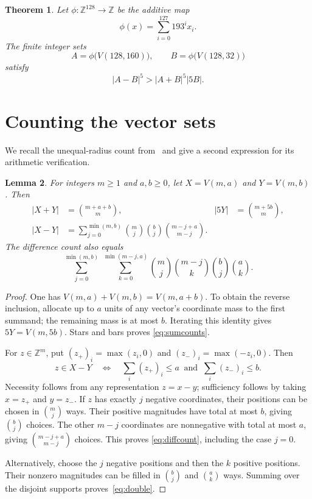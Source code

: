 \documentclass[11pt,a4paper]{article}
\newtheorem{theorem}{Theorem}
\newtheorem{lemma}[theorem]{Lemma}
\newcommand{\Z}{\mathbb Z}
\newcommand{\V}{V}
\begin{document}
\begin{samepage}
\begin{theorem}\label{thm:main}
Let $\phi:\Z^{128}\to\Z$ be the additive map
\[
 \phi(x)=\sum_{i=0}^{127}193^i x_i.
\]
The finite integer sets
\[
 A=\phi\bigl(\V(128,160)\bigr),\qquad
 B=\phi\bigl(\V(128,32)\bigr)
\]
satisfy
\begin{equation}\label{eq:failure}
 |A-B|^5>|A+B|^5|5B|.
\end{equation}
\end{theorem}
\end{samepage}

\section{Counting the vector sets}
We recall the unequal-radius count from~\cite[Lemma~B.1]{glasscock}
and give a second expression for its arithmetic verification.

\begin{lemma}\label{lem:counts}
For integers $m\ge1$ and $a,b\ge0$, let $X=\V(m,a)$ and $Y=\V(m,b)$. Then
\begin{align}
 |X+Y|&=\binom{m+a+b}{m}, &
 |5Y|&=\binom{m+5b}{m},\label{eq:sumcounts}\\
 |X-Y|&=\sum_{j=0}^{\min(m,b)}
       \binom mj\binom bj\binom{m-j+a}{m-j}.\label{eq:diffcount}
\end{align}
The difference count also equals
\begin{equation}\label{eq:double}
 \sum_{j=0}^{\min(m,b)}\ \sum_{k=0}^{\min(m-j,a)}
 \binom mj\binom{m-j}{k}\binom bj\binom ak.
\end{equation}
\end{lemma}

\begin{proof}
One has $\V(m,a)+\V(m,b)=\V(m,a+b)$. To obtain the reverse
inclusion, allocate up to $a$ units of any vector's coordinate mass
to the first summand; the remaining mass is at most $b$. Iterating
this identity gives $5Y=\V(m,5b)$. Stars and bars proves
\eqref{eq:sumcounts}.

For $z\in\Z^m$, put $(z_+)_i=\max(z_i,0)$ and
$(z_-)_i=\max(-z_i,0)$. Then
\[
 z\in X-Y\quad\Longleftrightarrow\quad
 \sum_i(z_+)_i\le a\ \text{ and }\ \sum_i(z_-)_i\le b.
\]
Necessity follows from any representation $z=x-y$; sufficiency follows
by taking $x=z_+$ and $y=z_-$. If $z$ has exactly $j$ negative
coordinates, their positions can be chosen in $\binom mj$ ways.
Their positive magnitudes have total at most $b$, giving $\binom bj$
choices. The other $m-j$ coordinates are nonnegative with total at
most $a$, giving $\binom{m-j+a}{m-j}$ choices. This proves
\eqref{eq:diffcount}, including the case $j=0$.

Alternatively, choose the $j$ negative positions and then the $k$
positive positions. Their nonzero magnitudes can be filled in
$\binom bj$ and $\binom ak$ ways. Summing over the disjoint supports
proves~\eqref{eq:double}.
\end{proof}
\end{document}
